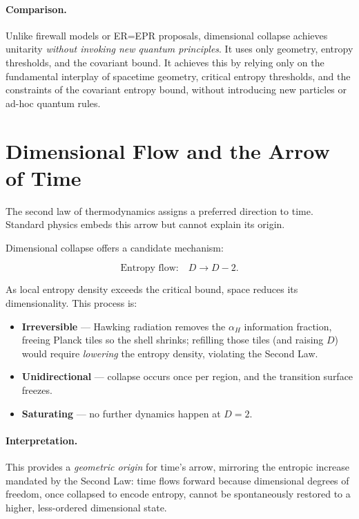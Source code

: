 \documentclass[a4paper, 12pt, oneside]{book}
\numberwithin{equation}{chapter}
\begin{document}
\paragraph{Comparison.}
Unlike firewall models or ER=EPR proposals, dimensional collapse achieves unitarity \emph{without invoking new quantum principles}.  
It uses only geometry, entropy thresholds, and the covariant bound. It achieves this by relying only on the fundamental interplay of spacetime geometry, critical entropy thresholds, and the constraints of the covariant entropy bound, without introducing new particles or ad-hoc quantum rules.

\section{Dimensional Flow and the Arrow of Time}
\label{sec:Arrow}

The second law of thermodynamics assigns a preferred direction to time.  
Standard physics embeds this arrow but cannot explain its origin.

Dimensional collapse offers a candidate mechanism:

\[
    \text{Entropy flow:} \quad D \to D-2.
\]

As local entropy density exceeds the critical bound, space reduces its dimensionality.  
This process is:

\begin{itemize}
  \item \textbf {Irreversible} — Hawking radiation removes the \(\alpha_H\) information fraction, freeing Planck tiles so the shell shrinks; refilling those tiles (and raising \(D\)) would require \emph{lowering} the entropy density, violating the Second Law.
  \item \textbf{Unidirectional} — collapse occurs once per region, and the transition surface freezes.
  \item \textbf{Saturating} — no further dynamics happen at \( D=2 \).
\end{itemize}

\paragraph{Interpretation.}
This provides a \emph{geometric origin} for time’s arrow, mirroring the entropic increase mandated by the Second Law: time flows forward because dimensional degrees of freedom, once collapsed to encode entropy, cannot be spontaneously restored to a higher, less-ordered dimensional state.
\end{document}

